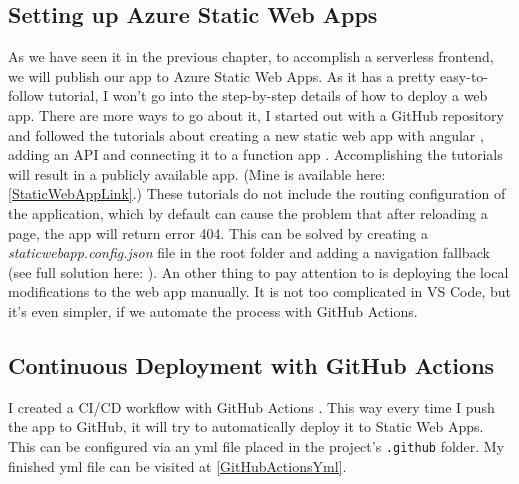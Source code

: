 \subsection{Setting up Azure Static Web Apps}
As we have seen it in the previous chapter, to accomplish a serverless frontend, we will publish our app to Azure Static Web Apps. As it has a pretty easy-to-follow tutorial, I won't go into the step-by-step details of how to deploy a web app. There are more ways to go about it, I started out with a GitHub repository and followed the tutorials about creating a new static web app with angular \cite{SWADeploy}, adding an API \cite{SWAAddAPI} and connecting it to a function app \cite{SWAAddFuncApp}. Accomplishing the tutorials will result in a publicly available app. (Mine is available here: \ref{StaticWebAppLink}.) These tutorials do not include the routing configuration of the application, which by default can cause the problem that after reloading a page, the app will return error 404. This can be solved by creating a \emph{staticwebapp.config.json} file in the root folder and adding a navigation fallback (see full solution here: \cite{SWAConfig}). An other thing to pay attention to is deploying the local modifications to the web app manually. It is not too complicated in VS Code, but it's even simpler, if we automate the process with GitHub Actions.
\subsection{Continuous Deployment with GitHub Actions}
I created a CI/CD workflow with GitHub Actions \cite{CI/CDGitHubActions}. This way every time I push the app to GitHub, it will try to automatically deploy it to Static Web Apps. This can be configured via an yml file placed in the project's \verb+.github+ folder. My finished yml file can be visited at \ref{GitHubActionsYml}.